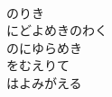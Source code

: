 \documentclass[10pt,b5j]{tarticle} %
\begin{document}
\begin{enumerate}
\begin{minipage}[c]{\blocksize}
    \end{minipage}
    \begin{minipage}[c]{\blocksize}
        
        \vspace{\linespace}
        \item~\\
        のりき\\
        にどよめきのわく\\
        のにゆらめき\\
        をむえりて\\
        はよみがえる
    
    \end{minipage}
\end{enumerate} %
\end{document}
